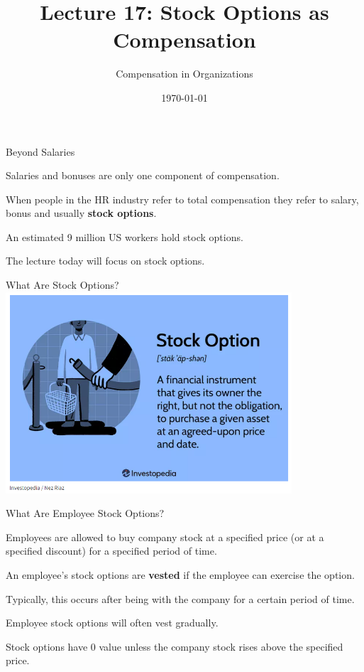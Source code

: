 \documentclass[aspectratio=169,usenames,dvipsnames]{beamer}
\title[diss]{Lecture 17: Stock Options as Compensation} %
\author{Compensation in Organizations} %
\institute[shortinst]{Jacob Kohlhepp}
\date{\today} %
\newenvironment{wideitemize}{\itemize\addtolength{\itemsep}{10pt}}{\enditemize}
\begin{document}
\begin{frame}
\titlepage %

\end{frame}

\begin{frame}{Beyond Salaries}
\begin{wideitemize}
    \item Salaries and bonuses are only one component of compensation.
    \item When people in the HR industry refer to total compensation they refer to salary, bonus and usually \textbf{stock options}.
    \item An estimated 9 million  US workers hold stock options.
    \item The lecture today will focus on stock options.
\end{wideitemize}
    
\end{frame}

\begin{frame}{What Are Stock Options?}
\centering
\includegraphics[width=0.8\textwidth]{pictures/stockoptions.png}

\end{frame}

\begin{frame}{What Are Employee Stock Options?}
\begin{wideitemize}
    \item Employees are allowed to buy company stock at a specified price (or at a specified discount) for a specified period of time.
    \item An employee's stock options are \textbf{vested} if the employee can exercise the option.
    \item Typically, this occurs after being with the company for a certain period of time.
    \item Employee stock options will often vest gradually.
    \item Stock options have 0 value unless the company stock rises above the specified price.
\end{wideitemize}

\end{frame}
\end{document}
